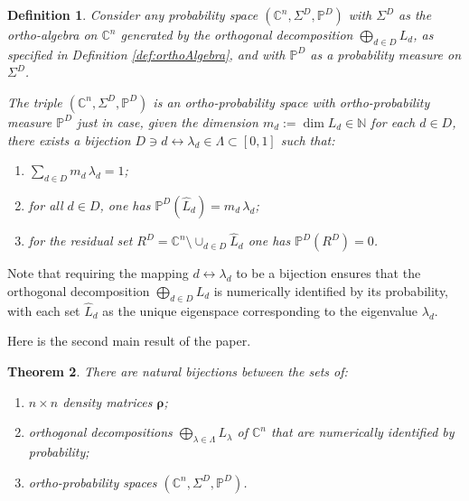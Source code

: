 \documentclass[11pt]{article}
\newcommand \N { \mathbb{N} }
\newcommand \C { \mathbb{C} }
\newtheorem{theorem}{Theorem}[section]
\newtheorem{definition}[theorem]{Definition}
\begin{document}
\begin{definition} \label{def:orthProb}
	Consider any probability space $( \C^n, \Sigma ^D, \mathbb P^D )$ 
	with $ \Sigma ^D $ as the ortho-algebra on $ \C^n $
 	generated by the orthogonal decomposition $ \bigoplus _{d \in D} L_d $,
	as specified in Definition \ref{def:orthoAlgebra},
	and with $ \mathbb P^D $ as a probability measure on $ \Sigma ^D $.

	The triple $( \C^n, \Sigma ^D, \mathbb P^D )$ is an \emph{ortho-probab\-ility space}
	with \emph{ortho-probab\-ility measure} $ \mathbb P^D $ just in case, 
	given the dimension $ m_d := \dim L_d \in \N$ for each $d \in D$, there exists a bijection 
 \( D \owns d \longleftrightarrow \lambda _d \in \Lambda \subset [0, 1] \) such that:
\begin{enumerate}
	\item $ \sum _{d \in D} m_d \, \lambda _d = 1$;
	\item for all $d \in D$, one has $ \mathbb P^D ( \hat L_d ) = m_d \, \lambda _d $;
	\item for the residual set $ R^D = \C^n \setminus \cup _{d \in D} \hat L_d $
	one has $ \mathbb P^D ( R^D ) = 0$.
\end{enumerate}
\end{definition}

Note that requiring the mapping $d \longleftrightarrow \lambda _d $ to be a bijection 
ensures that the orthogonal decomposition $ \bigoplus _{d \in D} L_d $
is numerically identified by its probability, with each set $ \hat L_d $ 
as the unique eigenspace corresponding to the eigenvalue $ \lambda _d $.     

Here is the second main result of the paper.

\begin{theorem} \label{thm:orthProb}
	There are natural bijections between the sets of:
	\begin{enumerate}
		\item $n \times n$ density matrices $ \boldsymbol \rho $;
		\item orthogonal decompositions $ \bigoplus _{ \lambda \in \Lambda } L_\lambda $ 
		of $ \C^n $ that are numerically identified by probability;
		\item ortho-probability spaces $( \C^n, \Sigma ^D, \mathbb P^D )$.	
	\end{enumerate}
\end{theorem}
\end{document}
